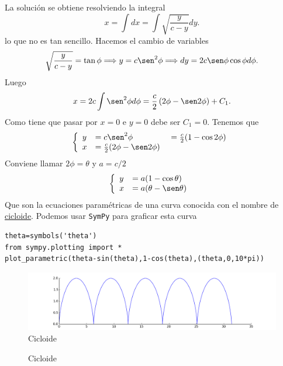\begin{subappendices}
La solución se obtiene resolviendo la integral
\[x=\int dx=\int \sqrt{\frac{y}{c-y}}dy.\]
lo que no es tan sencillo. Hacemos el cambio de variables
\[\sqrt{\frac{y}{c-y}}=\tan\phi\Longrightarrow y=c\sen^2\phi\Longrightarrow dy=2c\sen\phi\cos\phi d\phi.\]
Luego
\[x=2c\int\sen^2\phi d\phi=\frac{c}{2}\left(2\phi-\sen 2\phi\right)+C_1.\]
Como tiene que pasar por $x=0$ e $y=0$ debe ser $C_1=0$.  Tenemos que
 \[\left\{\begin{array}{l l l}
	      y&=c\sen^2 \phi&=\frac{c}{2}(1-\cos2\phi)\\
	      x&=\frac{c}{2}(2\phi-\sen2\phi)\ &\\
          \end{array}\right.
\]
Conviene llamar $2\phi=\theta$ y $a=c/2$
 \[\left\{\begin{array}{l l }
	      y&= a(1-\cos\theta)\\
	      x&=a(\theta-\sen\theta)\
          \end{array}\right.
\]
Que son la ecuaciones paramétricas de una curva conocida con el nombre de \href{http://es.wikipedia.org/wiki/Cicloide}{cicloide}\link. Podemos usar \texttt{SymPy} para graficar esta curva
\begin{lstlisting}
theta=symbols('theta')
from sympy.plotting import *
plot_parametric(theta-sin(theta),1-cos(theta),(theta,0,10*pi))
\end{lstlisting}
\begin{figure}[h]
\begin{center}
\includegraphics[scale=.3]{imagenes/cicloide.png}
\end{center}\caption{Cicloide}\label{fig:cicloide}
\end{figure}


\begin{figure}[h]
\begin{center}
\end{center}\caption{Cicloide}\label{fig:cicloide}
\end{figure}



\end{subappendices}
